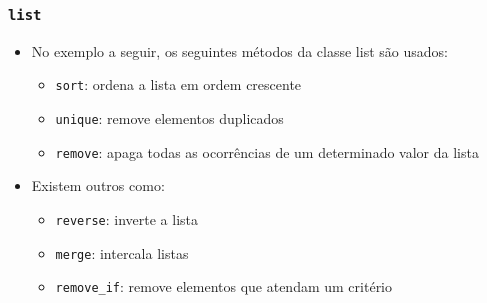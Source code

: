 \documentclass[xcolor={dvipsnames,table},aspectratio=169]{beamer}
\begin{document}
\begin{frame}\frametitle{\texttt{list}}
\begin{itemize}
	\item No exemplo a seguir, os seguintes métodos da classe list são usados:
	\begin{itemize}
		\item \texttt{sort}: ordena a lista em ordem crescente
		\item \texttt{unique}: remove elementos duplicados
		\item \texttt{remove}: apaga todas as ocorrências de um determinado valor da lista
	\end{itemize}
	\item Existem outros como:
	\begin{itemize}
		\item \texttt{reverse}: inverte a lista
		\item \texttt{merge}: intercala listas
		\item \texttt{remove\_if}: remove elementos que atendam um critério
	\end{itemize}
\end{itemize}
\end{frame}
\end{document}
